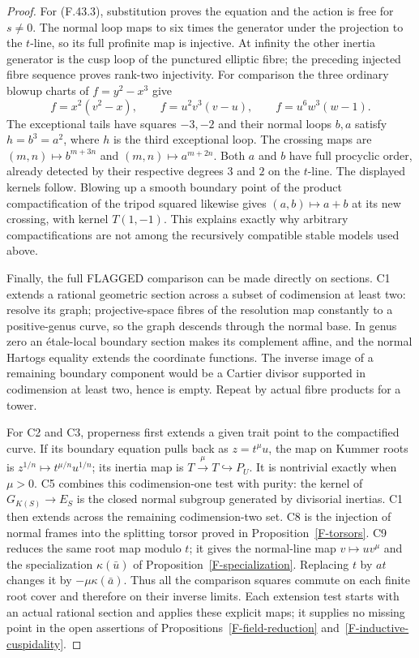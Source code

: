 \begin{proof}
For (F.43.3), substitution proves the equation and the
action is free for $s\ne0$. The normal loop maps to six
times the generator under the projection to the $t$-line,
so its full profinite map is injective. At infinity the
other inertia generator is the cusp loop of the punctured
elliptic fibre; the preceding injected fibre sequence
proves rank-two injectivity. For comparison the three
ordinary blowup charts of $f=y^2-x^3$ give
\[
 f=x^2(v^2-x),\qquad f=u^2v^3(v-u),\qquad
 f=u^6w^3(w-1).
\]
The exceptional tails have squares $-3,-2$ and their
normal loops $b,a$ satisfy $h=b^3=a^2$, where $h$ is
the third exceptional loop. The crossing maps are
$(m,n)\mapsto b^{m+3n}$ and $(m,n)\mapsto a^{m+2n}$.
Both $a$ and $b$ have full procyclic order, already
detected by their respective degrees $3$ and $2$ on the
$t$-line. The displayed kernels follow. Blowing up a
smooth boundary point of the product compactification of
the tripod squared likewise gives $(a,b)\mapsto a+b$
at its new crossing, with kernel $T(1,-1)$. This explains
exactly why arbitrary compactifications are not among
the recursively compatible stable models used above.

Finally, the full FLAGGED comparison can be made directly
on sections. C1 extends a rational geometric section
across a subset of codimension at least two: resolve its
graph; projective-space fibres of the resolution map
constantly to a positive-genus curve, so the graph
descends through the normal base. In genus zero an
\'etale-local boundary section makes its complement
affine, and the normal Hartogs equality extends the
coordinate functions. The inverse image of a remaining
boundary component would be a Cartier divisor supported
in codimension at least two, hence is empty. Repeat by
actual fibre products for a tower.

For C2 and C3, properness first extends a given trait
point to the compactified curve. If its boundary equation
pulls back as $z=t^\mu u$, the map on Kummer roots is
$z^{1/n}\mapsto t^{\mu/n}u^{1/n}$; its inertia map is
$T\xrightarrow{\mu}T\hookrightarrow P_U$. It is
nontrivial exactly when $\mu>0$. C5 combines this
codimension-one test with purity: the kernel of
$G_{K(S)}\to E_S$ is the closed normal subgroup generated
by divisorial inertias. C1 then extends across the
remaining codimension-two set. C8 is the injection of
normal frames into the splitting torsor proved in
Proposition~\ref{F-torsors}. C9 reduces the same root map
modulo $t$; it gives the normal-line map $v\mapsto u v^\mu$
and the specialization $\kappa(\bar u)$ of
Proposition~\ref{F-specialization}. Replacing $t$ by $at$
changes it by $-\mu\kappa(\bar a)$. Thus all the
comparison squares commute on each finite root cover
and therefore on their inverse limits. Each extension
test starts with an actual rational section and applies
these explicit maps; it supplies no missing point in
the open assertions of Propositions~\ref{F-field-reduction}
and~\ref{F-inductive-cuspidality}.
\end{proof}

